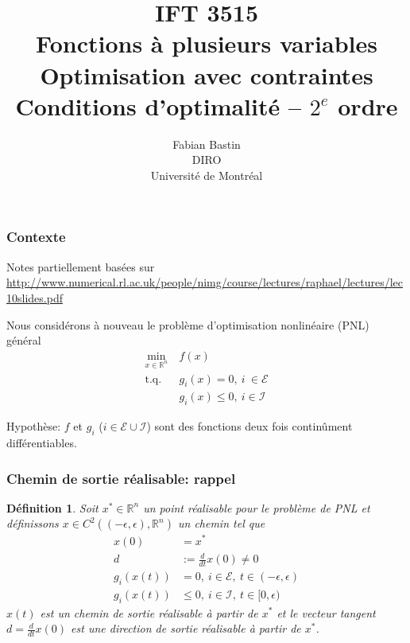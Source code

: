 \documentclass[usepdftitle=false]{beamer}
\title[IFT3515]{IFT 3515\\Fonctions à plusieurs variables\\Optimisation avec contraintes\\Conditions d'optimalité -- $2^e$ ordre}
\author[Fabian Bastin]{Fabian Bastin\\DIRO\\Université de Montréal}
\date{}
\newtheorem{defn}{Définition}
\def\red{\color{red}}
\def\cE{\mathcal{E}}
\def\cI{\mathcal{I}}
\def\RR{\mathbb{R}}
\begin{document}
\frame{\titlepage}


\begin{frame}
\frametitle{Contexte}

Notes partiellement basées sur \url{http://www.numerical.rl.ac.uk/people/nimg/course/lectures/raphael/lectures/lec10slides.pdf}

\mbox{}

Nous considérons à nouveau le problème d'optimisation nonlinéaire (PNL) général
\begin{align*}
\min_{x \in \RR^n}\ & f(x) \\
\mbox{t.q. } & g_i(x) = 0,\ i\ \in \cE \\
& g_i(x) \leq 0,\ i \in \cI
\end{align*}

Hypothèse: $f$ et $g_i$ ($i \in \cE \cup \cI$) sont des fonctions deux fois continûment différentiables.

\end{frame}

\begin{frame}
\frametitle{Chemin de sortie réalisable: rappel}

\begin{defn}
Soit $x^* \in \RR^n$ un point réalisable pour le problème de PNL et définissons $x \in C^2\left((-\epsilon,\epsilon), \RR^n \right)$ un chemin tel que
\begin{align*}
x(0) &= x^* \\
d &:= \frac{d}{dt}x(0) \ne 0 \\
g_i(x(t)) &= 0,\ i \in \cE,\ t \in (-\epsilon, \epsilon) \\
g_i(x(t)) &\leq 0,\ i \in \cI,\ t \in [0, \epsilon)
\end{align*}
$x(t)$ est {\red un chemin de sortie réalisable} à partir de $x^*$ et le vecteur tangent $d = \frac{d}{dt}x(0)$ est {\red une direction de sortie réalisable} à partir de $x^*$.
\end{defn}

\end{frame}
\end{document}
